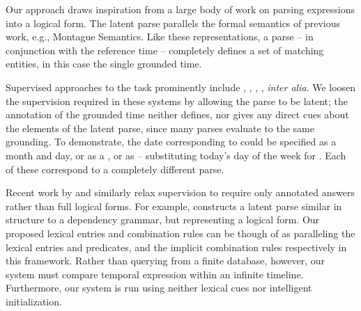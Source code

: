 Our approach draws inspiration from a large body of work
	on parsing expressions into a logical form.
The latent parse parallels the formal semantics of previous work,
	e.g., Montague Semantics.
Like these representations, a parse -- in conjunction with
	the reference time -- completely defines a set of
	matching entities, in this case the single grounded time.

Supervised approaches to the task prominently include
	,
	,
	, 
	, 
	\textit{inter alia}.
We loosen the supervision required in these systems by allowing the parse to
	be latent;
	the annotation of the grounded time neither defines, nor gives any
	direct cues about the elements of the latent parse, since many parses evaluate
	to the same grounding.
To demonstrate, the date corresponding to  could be
	specified as a month and day, or as a , or as  -- substituting today's day of the week for .
Each of these correspond to a completely different parse.

Recent work by  and 
	 similarly relax supervision 
	to require only annotated answers rather than full logical forms.
For example,  constructs a latent parse
	similar in structure to a dependency grammar, but representing a logical
	form.
Our proposed lexical entries and combination rules can be though of as
	paralleling the lexical entries and predicates, and the implicit combination 
	rules respectively in this framework.
Rather than querying from a finite database, however, our system must compare
	temporal expression within an infinite timeline.
Furthermore, our system is run using neither lexical cues nor intelligent
	initialization.

